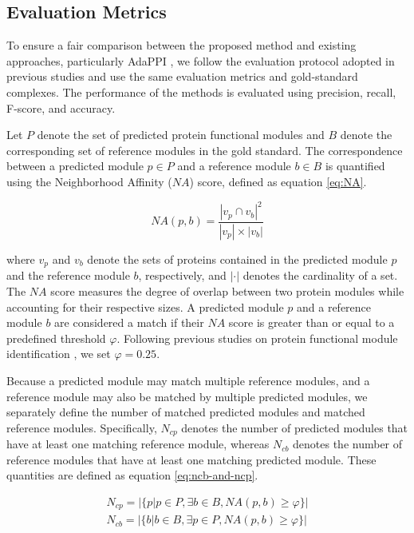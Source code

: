 \subsection{Evaluation Metrics}

To ensure a fair comparison between the proposed method and existing approaches, particularly AdaPPI \cite{}, we follow the evaluation protocol adopted in previous studies and use the same evaluation metrics and gold-standard complexes. The performance of the methods is evaluated using precision, recall, F-score, and accuracy.

Let $P$ denote the set of predicted protein functional modules and $B$ denote the corresponding set of reference modules in the gold standard. The correspondence between a predicted module $p \in P$ and a reference module $b \in B$ is quantified using the Neighborhood Affinity ($NA$) score, defined as equation \ref{eq:NA}.

\begin{equation}
	NA(p,b) =
	\frac{|v_p \cap v_b|^2}
	{|v_p| \times |v_b|}
	\label{eq:NA}
\end{equation}

where $v_p$ and $v_b$ denote the sets of proteins contained in the predicted module $p$ and the reference module $b$, respectively, and $|\cdot|$ denotes the cardinality of a set. The $NA$ score measures the degree of overlap between two protein modules while accounting for their respective sizes. A predicted module $p$ and a reference module $b$ are considered a match if their $NA$ score is greater than or equal to a predefined threshold $\varphi$. Following previous studies on protein functional module identification \cite{nonnegative}, we set $\varphi = 0.25$.

Because a predicted module may match multiple reference modules, and a reference module may also be matched by multiple predicted modules, we separately define the number of matched predicted modules and matched reference modules. Specifically, $N_{cp}$ denotes the number of predicted modules that have at least one matching reference module, whereas $N_{cb}$ denotes the number of reference modules that have at least one matching predicted module. These quantities are defined as equation \ref{eq:ncb-and-ncp}.

\begin{equation}
	\begin{gathered}
		N_{cp} = |\{p | p \in P, \exists b \in B, NA(p,b) \ge \varphi\}| \\
		N_{cb} = |\{b | b \in B, \exists p \in P, NA(p,b) \ge \varphi\}|
	\end{gathered}
	\label{eq:ncb-and-ncp}
\end{equation}

